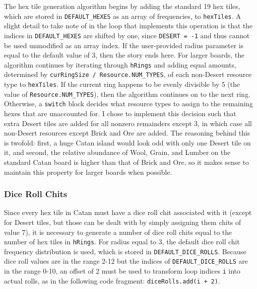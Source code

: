 \documentclass[pageno]{jpaper}
\begin{document}
\begin{doublespacing}
The hex tile generation algorithm begins by adding the standard 19 hex tiles, which are stored in \lstinline$DEFAULT_HEXES$ as an array of frequencies, to \lstinline$hexTiles$. A slight detail to take note of in the loop that implements this operation is that the indices in \lstinline$DEFAULT_HEXES$ are shifted by one, since \lstinline$DESERT = -1$ and thus cannot be used unmodified as an array index. If the user-provided radius parameter is equal to the default value of 3, then the story ends here. For larger boards, the algorithm continues by iterating through \lstinline$hRings$ and adding equal amounts, determined by \lstinline$curRingSize / Resource.NUM_TYPES$, of each non-Desert resource type to \lstinline$hexTiles$. If the current ring happens to be evenly divisible by 5 (the value of \lstinline$Resource.NUM_TYPES$), then the algorithm continues on to the next ring. Otherwise, a \lstinline$switch$ block decides what resource types to assign to the remaining hexes that are unaccounted for. I chose to implement this decision such that extra Desert tiles are added for all nonzero remainders except 3, in which case all non-Desert resources except Brick and Ore are added. The reasoning behind this is twofold: first, a huge Catan island would look odd with only one Desert tile on it, and second, the relative abundance of Wool, Grain, and Lumber on the standard Catan board is higher than that of Brick and Ore, so it makes sense to maintain this property for larger boards when possible.

\hypertarget{sec:dice_roll_chits}{}
\subsubsection{Dice Roll Chits}

Since every hex tile in Catan must have a dice roll chit associated with it (except for Desert tiles, but those can be dealt with by simply assigning them chits of value 7), it is necessary to generate a number of dice roll chits equal to the number of hex tiles in \lstinline$hRings$. For radius equal to 3, the default dice roll chit frequency distribution is used, which is stored in \lstinline$DEFAULT_DICE_ROLLS$. Because dice roll values are in the range 2-12 but the indices of \lstinline$DEFAULT_DICE_ROLLS$ are in the range 0-10, an offset of 2 must be used to transform loop indices \lstinline$i$ into actual rolls, as in the following code fragment: \lstinline$diceRolls.add(i + 2)$. 


\end{doublespacing}
\end{document}
